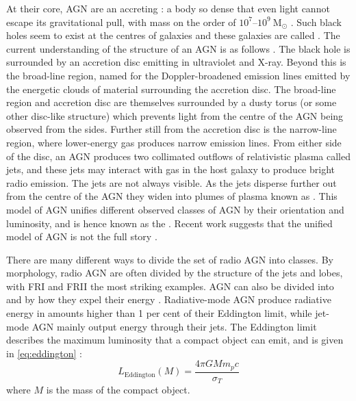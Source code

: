         At their core, AGN are an accreting : a body so dense that even light cannot escape its gravitational pull, with mass on the order of $10^7$--$10^9\ \mathrm{M}_\odot$ \citep{marconi_relation_2003}. Such black holes seem to exist at the centres of galaxies and these galaxies are called . The current understanding of the structure of an AGN is as follows \citep{urry95unified}. The black hole is surrounded by an accretion disc emitting in ultraviolet and X-ray. Beyond this is the broad-line region, named for the Doppler-broadened emission lines emitted by the energetic clouds of material surrounding the accretion disc. The broad-line region and accretion disc are themselves surrounded by a dusty torus (or some other disc-like structure) which prevents light from the centre of the AGN being observed from the sides. Further still from the accretion disc is the narrow-line region, where lower-energy gas produces narrow emission lines. From either side of the disc, an AGN produces two collimated outflows of relativistic plasma called {jets}, and these jets may interact with gas in the host galaxy to produce bright radio emission. The jets are not always visible. As the jets disperse further out from the centre of the AGN they widen into plumes of plasma known as . This model of AGN unifies different observed classes of AGN by their orientation and luminosity, and is hence known as the  \citep{antonucci_unified_1993}. Recent work suggests that the unified model of AGN is not the full story \citep[e.g.][]{zhuang_interplay_2020}.

        There are many different ways to divide the set of radio AGN into classes. By morphology, radio AGN are often divided by the structure of the jets and lobes, with FRI and FRII the most striking examples. AGN can also be divided into  and  by how they expel their energy \citep{heckman_coevolution_2014}. Radiative-mode AGN produce radiative energy in amounts higher than 1 per cent of their Eddington limit, while jet-mode AGN mainly output energy through their jets. The Eddington limit describes the maximum luminosity that a compact object can emit, and is given in \autoref{eq:eddington} \citep{rybicki_radiative_2008}:
        \begin{equation}
            L_{\mathrm{Eddington}}(M) = \frac{4\pi G M m_p c}{\sigma_T}
            \label{eq:eddington}
        \end{equation}
        where $M$ is the mass of the compact object.

